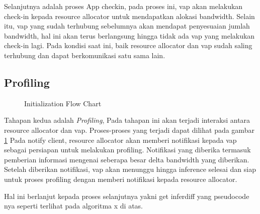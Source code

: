         Selanjutnya adalah proses App checkin, pada proses ini, \gls{vap} akan melakukan check-in kepada resource allocator untuk mendapatkan alokasi bandwidth. Selain itu, \gls{vap}
        yang sudah terhubung sebelumnya akan mendapat penyesuaian jumlah bandwidth, hal ini akan terus berlangsung hingga tidak ada \gls{vap} yang melakukan check-in lagi.
        Pada kondisi saat ini, baik resource allocator dan \gls{vap} sudah saling terhubung dan dapat berkomunikasi satu sama lain.

    \subsection{Profiling}

        \begin{figure}[tbh]
            \centering
            
            \caption{Initialization Flow Chart}\label{fig:profiling}
        \end{figure} 

        Tahapan kedua adalah \textit{Profiling}, Pada tahapan ini akan terjadi interaksi antara resource allocator dan \gls{vap}. Proses-proses yang terjadi dapat dilihat pada gambar \ref{fig:profiling}
        Pada notify client, resource allocator akan memberi notifikasi kepada \gls{vap} sebagai persiapan untuk melakukan profiling. Notifikasi yang diberika termasuk pemberian informasi mengenai seberapa
        besar delta bandwidth yang diberikan. Setelah diberikan notifikasi, \gls{vap} akan menunggu hingga inference selesai dan siap untuk proses profiling dengan memberi notifikasi kepada resource allocator.

        Hal ini berlanjut kepada proses selanjutnya yakni get inferdiff yang pseudocode nya seperti terlihat pada algoritma x di atas.



